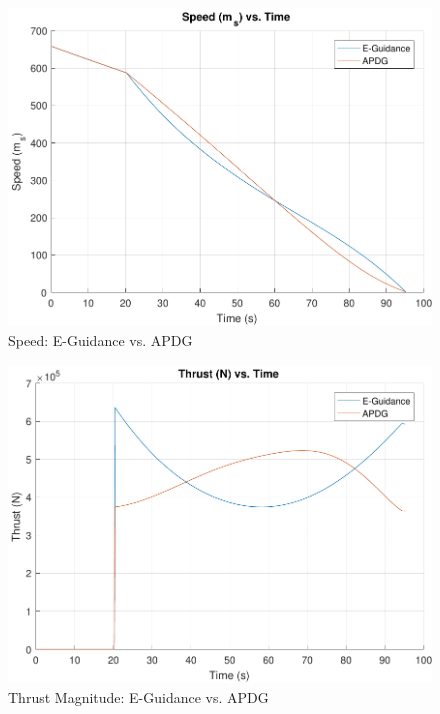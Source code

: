 \begin{figure}[H]
	\centering
	\begin{minipage}{4.5 in}
		\includegraphics[width=\linewidth]{Figures/spdEvsADPG.pdf}
		\caption{Speed: E-Guidance vs. APDG \label{fig:spdEvsADPG} }
	\end{minipage}
\end{figure}

\begin{figure}[H]
	\centering
	\begin{minipage}{4.5 in}
		\includegraphics[width=\linewidth]{Figures/thrEvsADPG.pdf}
		\caption{Thrust Magnitude: E-Guidance vs. APDG \label{fig:thrEvsADPG} }
	\end{minipage}
\end{figure}

